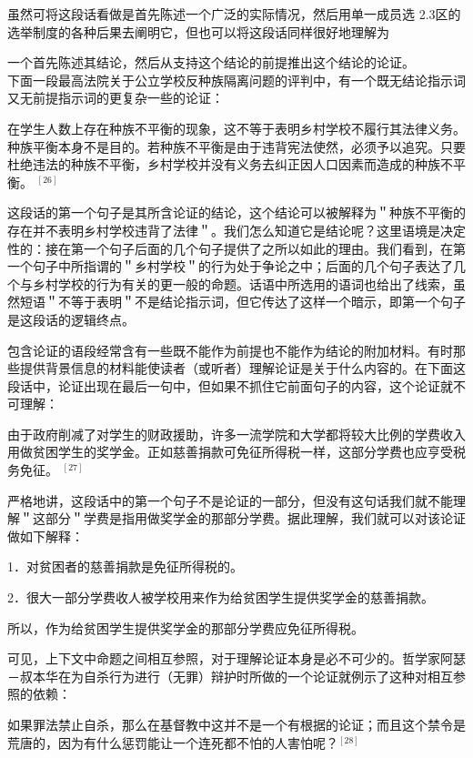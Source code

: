 虽然可将这段话看做是首先陈述一个广泛的实际情况，然后用单一成员选 2.3区的选举制度的各种后果去阐明它，但也可以将这段话同样很好地理解为

一个首先陈述其结论，然后从支持这个结论的前提推出这个结论的论证。\\
下面一段最高法院关于公立学校反种族隔离问题的评判中，有一个既无结论指示词又无前提指示词的更复杂一些的论证：

\begin{displayquote}
在学生人数上存在种族不平衡的现象，这不等于表明乡村学校不履行其法律义务。种族平衡本身不是目的。若种族不平衡是由于违背宪法使然，必须予以追究。只要杜绝违法的种族不平衡，乡村学校并没有义务去纠正因人口因素而造成的种族不平衡。 ${ }^{[26]}$
\end{displayquote}

这段话的第一个句子是其所含论证的结论，这个结论可以被解释为＂种族不平衡的存在并不表明乡村学校违背了法律＂。我们怎么知道它是结论呢？这里语境是决定性的：接在第一个句子后面的几个句子提供了之所以如此的理由。我们看到，在第一个句子中所指谓的＂乡村学校＂的行为处于争论之中；后面的几个句子表达了几个与乡村学校的行为有关的更一般的命题。话语中所选用的语词也给出了线索，虽然短语＂不等于表明＂不是结论指示词，但它传达了这样一个暗示，即第一个句子是这段话的逻辑终点。

包含论证的语段经常含有一些既不能作为前提也不能作为结论的附加材料。有时那些提供背景信息的材料能使读者（或听者）理解论证是关于什么内容的。在下面这段话中，论证出现在最后一句中，但如果不抓住它前面句子的内容，这个论证就不可理解：

由于政府削减了对学生的财政援助，许多一流学院和大学都将较大比例的学费收入用做贫困学生的奖学金。正如慈善捐款可免征所得税一样，这部分学费也应亨受税务免征。 ${ }^{[27]}$

严格地讲，这段话中的第一个句子不是论证的一部分，但没有这句话我们就不能理解＂这部分＂学费是指用做奖学金的那部分学费。据此理解，我们就可以对该论证做如下解释：

1．对贫困者的慈善捐款是免征所得税的。

2．很大一部分学费收人被学校用来作为给贫困学生提供奖学金的慈善捐款。

所以，作为给贫困学生提供奖学金的那部分学费应免征所得税。

可见，上下文中命题之间相互参照，对于理解论证本身是必不可少的。哲学家阿瑟－叔本华在为自杀行为进行（无罪）辩护时所做的一个论证就例示了这种对相互参照的依赖：

\begin{displayquote}
如果罪法禁止自杀，那么在基督教中这并不是一个有根据的论证；而且这个禁令是荒唐的，因为有什么惩罚能让一个连死都不怕的人害怕呢？${ }^{[28]}$
\end{displayquote}


